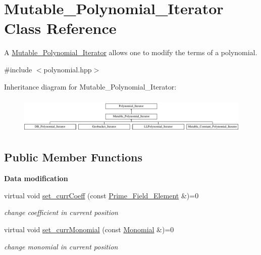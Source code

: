\hypertarget{class_mutable___polynomial___iterator}{}\section{Mutable\+\_\+\+Polynomial\+\_\+\+Iterator Class Reference}
\label{class_mutable___polynomial___iterator}


A \hyperlink{class_mutable___polynomial___iterator}{Mutable\+\_\+\+Polynomial\+\_\+\+Iterator} allows one to modify the terms of a polynomial.  




{\ttfamily \#include $<$polynomial.\+hpp$>$}

Inheritance diagram for Mutable\+\_\+\+Polynomial\+\_\+\+Iterator\+:\begin{figure}[H]
\begin{center}
\leavevmode
\includegraphics[height=1.779661cm]{class_mutable___polynomial___iterator}
\end{center}
\end{figure}
\subsection*{Public Member Functions}
\begin{Indent}\textbf{ Data modification}\par
\begin{DoxyCompactItemize}
\item 
\mbox{\label{class_mutable___polynomial___iterator_a68d273d038b81b687559cf3e7f2c6df3}} 
virtual void \hyperlink{class_mutable___polynomial___iterator_a68d273d038b81b687559cf3e7f2c6df3}{set\+\_\+curr\+Coeff} (const \hyperlink{class_prime___field___element}{Prime\+\_\+\+Field\+\_\+\+Element} \&)=0
\begin{DoxyCompactList}\small\item\em change coefficient in current position \end{DoxyCompactList}\item 
\mbox{\label{class_mutable___polynomial___iterator_aeb3668fd81e4284a84c8be4cd2416009}} 
virtual void \hyperlink{class_mutable___polynomial___iterator_aeb3668fd81e4284a84c8be4cd2416009}{set\+\_\+curr\+Monomial} (const \hyperlink{class_monomial}{Monomial} \&)=0
\begin{DoxyCompactList}\small\item\em change monomial in current position \end{DoxyCompactList}\end{DoxyCompactItemize}
\end{Indent}
